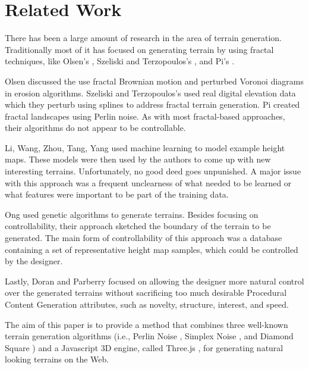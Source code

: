 \section{Related Work} 
\label{sec:related_work}

There has been a large amount of research in the area of terrain generation. Traditionally most of it has focused on generating terrain by using fractal techniques, like Olsen's \cite{lechner:2006}, Szeliski and Terzopoulos's \cite{szeliski:1989}, and Pi's \cite{pi:2006}.

Olsen \cite{lechner:2006} discussed the use fractal Brownian motion and perturbed Voronoi diagrams in erosion algorithms. Szeliski and Terzopoulos's \cite{szeliski:1989} used real digital elevation data which they perturb using splines to address fractal terrain generation. Pi \cite{pi:2006} created fractal landscapes using Perlin noise. As with most fractal-based approaches, their algorithms do not appear to be controllable.

Li, Wang, Zhou, Tang, Yang \cite{li:2006} used machine learning to model example height maps. These models were then used by the authors to come up with new interesting terrains. Unfortunately, no good deed goes unpunished. A major issue with this approach was a frequent unclearness of what needed to be learned or what features were important to be part of the training data.

Ong \cite{ong:2005} used genetic algorithms to generate terrains. Besides focusing on controllability, their approach sketched the boundary of the terrain to be generated. The main form of controllability of this approach was a database containing a set of representative height map samples, which could be controlled by the designer.
  
Lastly, Doran and Parberry \cite{doran:2010} focused on allowing the designer more natural control over the generated terrains without sacrificing too much desirable Procedural Content Generation attributes, such as novelty, structure, interest, and speed.

The aim of this paper is to provide a method that combines three well-known terrain generation algorithms (i.e., Perlin Noise  \cite{perlin:2002}, Simplex Noise \cite{perlin:2001}, and Diamond Square \cite{fournier:1982}) and a Javascript 3D engine, called Three.js \cite{threeJS}, for generating natural looking terrains on the Web.

